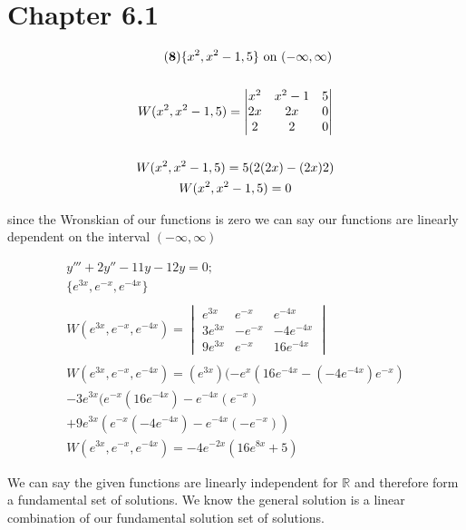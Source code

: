 \documentclass{article}
\begin{document}
    \section*{Chapter 6.1}
    \begin{gather*}\tag{\textbf{8}}
        \{x^2,x^2-1,5\} \text{ on } (-\infty,\infty)\\\\
        W(x^2,x^2-1,5) = 
        \begin{vmatrix}
            x^2 & x^2-1 & 5\\
            2x & 2x & 0\\
            2 & 2 & 0
        \end{vmatrix}\\\\
        W(x^2,x^2-1,5) =  5(2(2x)-(2x)2)\\
        W(x^2,x^2-1,5) = 0\\
    \end{gather*}
    \begin{center}
        since the Wronskian of our functions is zero we can say our functions are linearly dependent on the interval $(-\infty,\infty)$
    \end{center}
    \begin{gather*}
        y'''+2y''-11y-12y=0;\\
        \{e^{3x},e^{-x},e^{-4x}\}\\\\
        W(e^{3x},e^{-x},e^{-4x}) =
        \begin{vmatrix}
            e^{3x} & e^{-x} & e^{-4x}\\
            3e^{3x} & -e^{-x} & -4e^{-4x}\\
            9e^{3x} &  e^{-x} & 16e^{-4x}
        \end{vmatrix}
        \\\\
        W(e^{3x},e^{-x},e^{-4x}) = (e^{3x})(-e^{x}(16e^{-4x} - (-4e^{-4x})e^{-x})\\ -3e^{3x}(e^{-x}(16e^{-4x})-e^{-4x}(e^{-x})\\ +  9e^{3x}(e^{-x}(-4e^{-4x}) - e^{-4x}(-e^{-x}))\\
        W(e^{3x},e^{-x},e^{-4x}) = -4e^{-2x}(16e^{8x}+5)
    \end{gather*}
    \begin{center}
        We can say the given functions are linearly independent for $\mathbb{R}$ and therefore form a fundamental set of solutions. We know the general solution is a linear combination of our fundamental solution set of solutions.
    \end{center}
\end{document}
